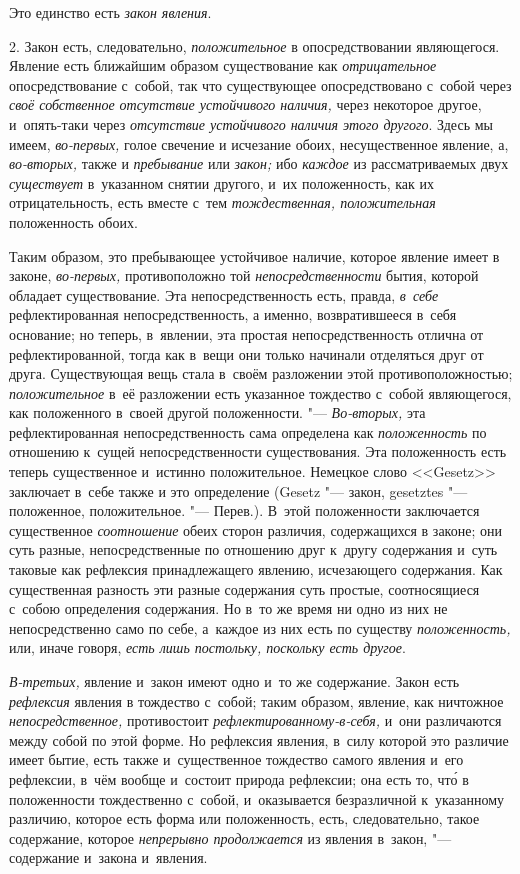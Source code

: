 Это единство есть {\em закон явления}.

2. Закон есть, следовательно, {\em положительное} в
опосредствовании являющегося. Явление есть ближайшим образом существование
как {\em отрицательное} опосредствование с~собой, так
что существующее опосредствовано с~собой через
{\em своё собственное отсутствие устойчивого наличия,}
через некоторое другое, и~опять-таки через
{\em отсутствие устойчивого наличия этого другого}.
Здесь мы имеем, {\em во-первых,} голое свечение и
исчезание обоих, несущественное явление, а,
{\em во-вторых,} также и {\em пребывание} или {\em закон;}
ибо {\em каждое} из рассматриваемых двух
{\em существует} в~указанном снятии другого, и~их
положенность, как их отрицательность, есть вместе с~тем
{\em тождественная, положительная} положенность обоих.

Таким образом, это пребывающее устойчивое наличие, которое явление имеет в
законе, {\em во-первых,} противоположно той
{\em непосредственности} бытия, которой обладает
существование. Эта непосредственность есть, правда,
{\em в~себе} рефлектированная непосредственность, а
именно, возвратившееся в~себя основание; но теперь, в~явлении, эта простая
непосредственность отлична от рефлектированной, тогда как в~вещи они только
начинали отделяться друг от друга. Существующая вещь стала в~своём
разложении этой противоположностью; {\em положительное}
в~её разложении есть указанное тождество с~собой являющегося, как
положенного в~своей другой положенности. "---
{\em Во-вторых,} эта рефлектированная непосредственность сама определена как
{\em положенность} по отношению к~сущей
непосредственности существования. Эта положенность есть теперь существенное
и~истинно положительное. Немецкое слово <<Gesetz>> заключает в~себе также и
это определение (Gesetz "--- закон, gesetztes "--- положенное,
положительное. "--- Перев.). В~этой положенности заключается существенное
{\em соотношение} обеих сторон различия, содержащихся в
законе; они суть разные, непосредственные по отношению друг к~другу
содержания и~суть таковые как рефлексия принадлежащего явлению, исчезающего
содержания. Как существенная разность эти разные содержания суть простые,
соотносящиеся с~собою определения содержания. Но в~то же время ни одно из
них не непосредственно само по себе, а~каждое из них есть по существу
{\em положенность,} или, иначе говоря,
{\em есть лишь постольку, поскольку есть другое}.

{\em В-третьих,} явление и~закон имеют одно и~то же
содержание. Закон есть {\em рефлексия} явления в
тождество с~собой; таким образом, явление, как ничтожное
{\em непосредственное,} противостоит
{\em рефлектированному-в-себя,} и~они различаются между
собой по этой форме. Но рефлексия явления, в~силу которой это различие
имеет бытие, есть также и~существенное тождество самого явления и~его
рефлексии, в~чём вообще и~состоит природа рефлексии; она есть то, чт\'{о} в
положенности тождественно с~собой, и~оказывается безразличной к~указанному
различию, которое есть форма или положенность, есть, следовательно, такое
содержание, которое {\em непрерывно продолжается} из
явления в~закон, "--- содержание и~закона и~явления.

